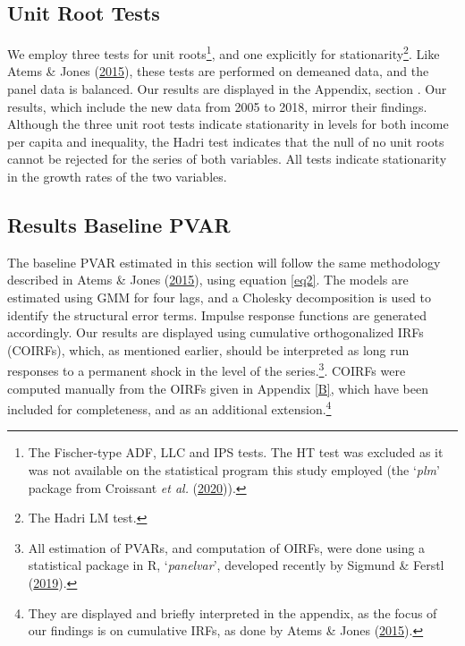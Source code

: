 \documentclass[11pt,preprint, authoryear]{elsarticle}
\numberwithin{equation}{section}
\numberwithin{figure}{section}
\numberwithin{table}{section}
\let\rmarkdownfootnote\footnote%
\def\footnote{\protect\rmarkdownfootnote}
\begin{document}
\hypertarget{unit-root-tests}{%
\subsection{\texorpdfstring{Unit Root Tests
\label{Section 3.2}}{Unit Root Tests }}\label{unit-root-tests}}

We employ three tests for unit roots\footnote{The Fischer-type ADF, LLC
  and IPS tests. The HT test was excluded as it was not available on the
  statistical program this study employed (the `\emph{plm}' package from
  Croissant \emph{et al.}
  (\protect\hyperlink{ref-croissant2020package}{2020})).}, and one
explicitly for stationarity\footnote{The Hadri LM test.}. Like Atems \&
Jones (\protect\hyperlink{ref-atems}{2015}), these tests are performed
on demeaned data, and the panel data is balanced. Our results are
displayed in the Appendix, section . Our results, which include
the new data from 2005 to 2018, mirror their findings. Although the
three unit root tests indicate stationarity in levels for both income
per capita and inequality, the Hadri test indicates that the null of no
unit roots cannot be rejected for the series of both variables. All
tests indicate stationarity in the growth rates of the two variables.

\hypertarget{results-baseline-pvar}{%
\subsection{\texorpdfstring{Results Baseline PVAR
\label{Section 3.3}}{Results Baseline PVAR }}\label{results-baseline-pvar}}

The baseline PVAR estimated in this section will follow the same
methodology described in Atems \& Jones
(\protect\hyperlink{ref-atems}{2015}), using equation \ref{eq2}. The
models are estimated using GMM for four lags, and a Cholesky
decomposition is used to identify the structural error terms. Impulse
response functions are generated accordingly. Our results are displayed
using cumulative orthogonalized IRFs (COIRFs), which, as mentioned
earlier, should be interpreted as long run responses to a permanent
shock in the level of the series.\footnote{All estimation of PVARs, and
  computation of OIRFs, were done using a statistical package in R,
  `\emph{panelvar}', developed recently by Sigmund \& Ferstl
  (\protect\hyperlink{ref-sigmund2019panel}{2019}).}. COIRFs were
computed manually from the OIRFs given in Appendix \ref{B}, which have
been included for completeness, and as an additional
extension.\footnote{They are displayed and briefly interpreted in the
  appendix, as the focus of our findings is on cumulative IRFs, as done
  by Atems \& Jones (\protect\hyperlink{ref-atems}{2015}).}
\end{document}
